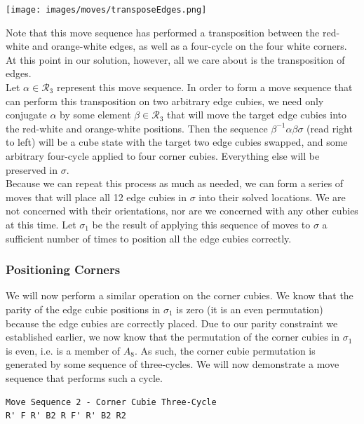 \documentclass[10pt,letterpaper]{report}
\begin{document}
\begin{center}
\texttt{[image: images/moves/transposeEdges.png]} 
\end{center}

Note that this move sequence has performed a transposition between the red-white and orange-white edges, as well as a four-cycle on the four white corners.  At this point in our solution, however, all we care about is the transposition of edges. \\

Let $\alpha \in \mathcal{R}_3$ represent this move sequence.  In order to form a move sequence that can perform this transposition on two arbitrary edge cubies, we need only conjugate $\alpha$ by some element $\beta \in \mathcal{R}_3$ that will move the target edge cubies into the red-white and orange-white positions.  Then the sequence $\beta^{-1}\alpha\beta\sigma$ (read right to left) will be a cube state with the target two edge cubies swapped, and some arbitrary four-cycle applied to four corner cubies.  Everything else will be preserved in $\sigma$. \\

Because we can repeat this process as much as needed, we can form a series of moves that will place all 12 edge cubies in $\sigma$ into their solved locations.  We are not concerned with their orientations, nor are we concerned with any other cubies at this time.  Let $\sigma_1$ be the result of applying this sequence of moves to $\sigma$ a sufficient number of times to position all the edge cubies correctly.

\subsubsection{Positioning Corners}

We will now perform a similar operation on the corner cubies.  We know that the parity of the edge cubie positions in $\sigma_1$ is zero (it is an even permutation) because the edge cubies are correctly placed.  Due to our parity constraint we established earlier, we now know that the permutation of the corner cubies in $\sigma_1$ is even, i.e. is a member of $A_8$.  As such, the corner cubie permutation is generated by some sequence of three-cycles.  We will now demonstrate a move sequence that performs such a cycle. \\

\begin{verbatim}
Move Sequence 2 - Corner Cubie Three-Cycle
R' F R' B2 R F' R' B2 R2
\end{verbatim}
\end{document}
